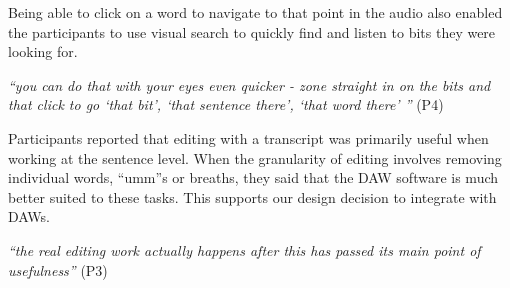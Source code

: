 
Being able to click on a word to navigate to that point in the audio also
enabled the participants to use visual search to quickly find and listen to
bits they were looking for.

\textit{``you can do that with your eyes even quicker - zone straight in on the bits and that click to go  `that bit',
  `that sentence there', `that word there' ''} (P4)

Participants reported that editing with a transcript was primarily useful when working at the sentence level. When the
granularity of editing involves removing individual words, ``umm''s or breaths, they said that the DAW software is much
better suited to these tasks. This supports our design decision to integrate with DAWs.

\textit{``the real editing work actually happens after this has passed its main
  point of usefulness''} (P3)









